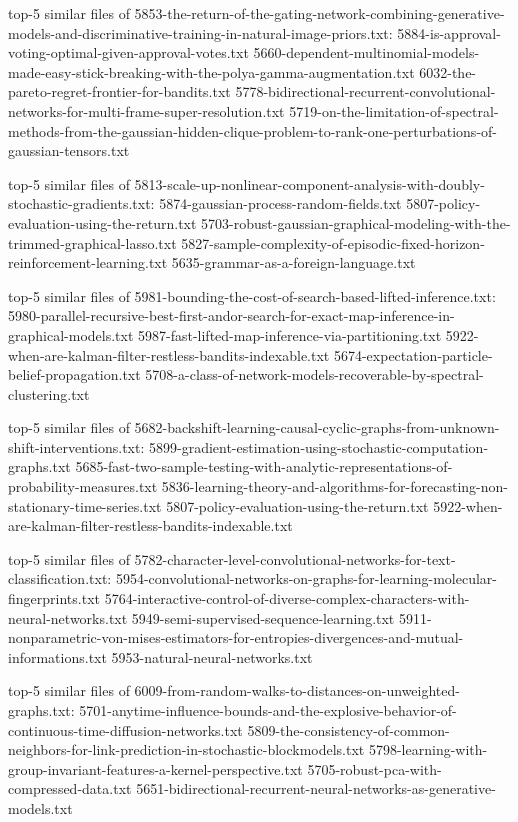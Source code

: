 \documentclass[11pt]{article}
\begin{document}
top-5 similar files of
5853-the-return-of-the-gating-network-combining-generative-models-and-discriminative-training-in-natural-image-priors.txt:
5884-is-approval-voting-optimal-given-approval-votes.txt
5660-dependent-multinomial-models-made-easy-stick-breaking-with-the-polya-gamma-augmentation.txt
6032-the-pareto-regret-frontier-for-bandits.txt
5778-bidirectional-recurrent-convolutional-networks-for-multi-frame-super-resolution.txt
5719-on-the-limitation-of-spectral-methods-from-the-gaussian-hidden-clique-problem-to-rank-one-perturbations-of-gaussian-tensors.txt

top-5 similar files of
5813-scale-up-nonlinear-component-analysis-with-doubly-stochastic-gradients.txt:
5874-gaussian-process-random-fields.txt
5807-policy-evaluation-using-the-return.txt
5703-robust-gaussian-graphical-modeling-with-the-trimmed-graphical-lasso.txt
5827-sample-complexity-of-episodic-fixed-horizon-reinforcement-learning.txt
5635-grammar-as-a-foreign-language.txt

top-5 similar files of
5981-bounding-the-cost-of-search-based-lifted-inference.txt:
5980-parallel-recursive-best-first-andor-search-for-exact-map-inference-in-graphical-models.txt
5987-fast-lifted-map-inference-via-partitioning.txt
5922-when-are-kalman-filter-restless-bandits-indexable.txt
5674-expectation-particle-belief-propagation.txt
5708-a-class-of-network-models-recoverable-by-spectral-clustering.txt

top-5 similar files of
5682-backshift-learning-causal-cyclic-graphs-from-unknown-shift-interventions.txt:
5899-gradient-estimation-using-stochastic-computation-graphs.txt
5685-fast-two-sample-testing-with-analytic-representations-of-probability-measures.txt
5836-learning-theory-and-algorithms-for-forecasting-non-stationary-time-series.txt
5807-policy-evaluation-using-the-return.txt
5922-when-are-kalman-filter-restless-bandits-indexable.txt

top-5 similar files of
5782-character-level-convolutional-networks-for-text-classification.txt:
5954-convolutional-networks-on-graphs-for-learning-molecular-fingerprints.txt
5764-interactive-control-of-diverse-complex-characters-with-neural-networks.txt
5949-semi-supervised-sequence-learning.txt
5911-nonparametric-von-mises-estimators-for-entropies-divergences-and-mutual-informations.txt
5953-natural-neural-networks.txt

top-5 similar files of
6009-from-random-walks-to-distances-on-unweighted-graphs.txt:
5701-anytime-influence-bounds-and-the-explosive-behavior-of-continuous-time-diffusion-networks.txt
5809-the-consistency-of-common-neighbors-for-link-prediction-in-stochastic-blockmodels.txt
5798-learning-with-group-invariant-features-a-kernel-perspective.txt
5705-robust-pca-with-compressed-data.txt
5651-bidirectional-recurrent-neural-networks-as-generative-models.txt
\end{document}
